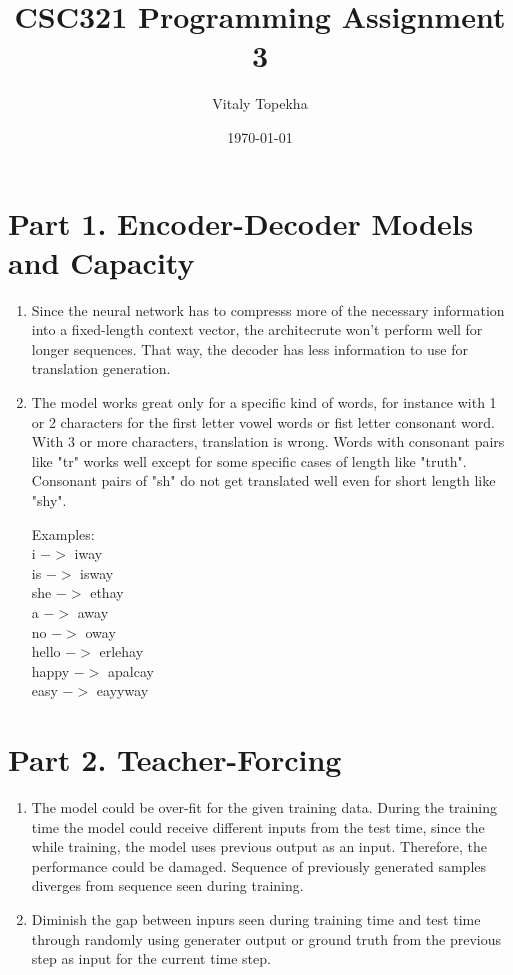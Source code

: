 \documentclass{article}
\title{CSC321  Programming Assignment 3}
\author{Vitaly Topekha}
\date{\today}
\begin{document}
\maketitle

\section{Part 1. Encoder-Decoder Models and Capacity}

\begin{enumerate}
    \item Since the neural network has to compresss more of the necessary information into a fixed-length context vector, the architecrute won't perform well for longer sequences. That way, the decoder has less information to use for translation generation.
    \item The model works great only for a specific kind of words, for instance with 1 or 2 characters for the first letter vowel words or fist letter consonant word. With 3 or more characters, translation is wrong. Words with consonant pairs like "tr" works well except for some specific cases of length like "truth". Consonant pairs of "sh" do not get translated well even for short length like "shy".
    
    Examples:\\
    i $->$ iway \\
    is $->$ isway \\
    she $->$ ethay \\
    a $->$ away \\
    no $->$ oway \\
    hello $->$ erlehay \\
    happy $->$ apalcay \\
    easy $->$ eayyway \\
    
\end{enumerate}

\section{Part 2. Teacher-Forcing}
\begin{enumerate}
    \item The model could be over-fit for the given training data. During the training time the model could receive different inputs from the test time, since the while training, the model uses previous output as an input. Therefore, the performance could be damaged. Sequence of previously generated samples diverges from sequence seen during training.
    \item Diminish the gap between inpurs seen during training time and test time through randomly using generater output or ground truth from the previous step as input for the current time step.
\end{enumerate}
\end{document}

